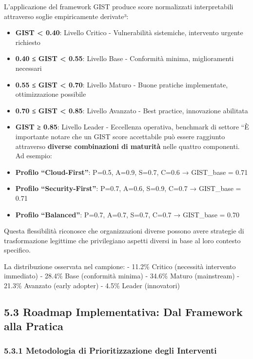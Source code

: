 \documentclass{report}
\begin{document}
L'applicazione del framework GIST produce score normalizzati
interpretabili attraverso soglie empiricamente derivate³:

\begin{itemize}
\item
  \textbf{GIST \textless{} 0.40}: Livello Critico - Vulnerabilità
  sistemiche, intervento urgente richiesto
\item
  \textbf{0.40 ≤ GIST \textless{} 0.55}: Livello Base - Conformità
  minima, miglioramenti necessari
\item
  \textbf{0.55 ≤ GIST \textless{} 0.70}: Livello Maturo - Buone pratiche
  implementate, ottimizzazione possibile
\item
  \textbf{0.70 ≤ GIST \textless{} 0.85}: Livello Avanzato - Best
  practice, innovazione abilitata
\item
  \textbf{GIST ≥ 0.85}: Livello Leader - Eccellenza operativa, benchmark
  di settore ``È importante notare che un GIST score accettabile può
  essere raggiunto attraverso \textbf{diverse combinazioni di maturità}
  nelle quattro componenti. Ad esempio:
\item
  \textbf{Profilo ``Cloud-First''}: P=0.5, A=0.9, S=0.7, C=0.6 →
  GIST\_base = 0.71\\
\item
  \textbf{Profilo ``Security-First''}: P=0.7, A=0.6, S=0.9, C=0.7 →
  GIST\_base = 0.71\\
\item
  \textbf{Profilo ``Balanced''}: P=0.7, A=0.7, S=0.7, C=0.7 → GIST\_base
  = 0.70
\end{itemize}

Questa flessibilità riconosce che organizzazioni diverse possono avere
strategie di trasformazione legittime che privilegiano aspetti diversi
in base al loro contesto specifico.

La distribuzione osservata nel campione: - 11.2\% Critico (necessità
intervento immediato) - 28.4\% Base (conformità minima) - 34.6\% Maturo
(mainstream) - 21.3\% Avanzato (early adopter) - 4.5\% Leader
(innovatori)

\subsection{5.3 Roadmap Implementativa: Dal Framework alla
Pratica}\label{roadmap-implementativa-dal-framework-alla-pratica}

\subsubsection{5.3.1 Metodologia di Prioritizzazione degli
Interventi}\label{metodologia-di-prioritizzazione-degli-interventi}
\end{document}
